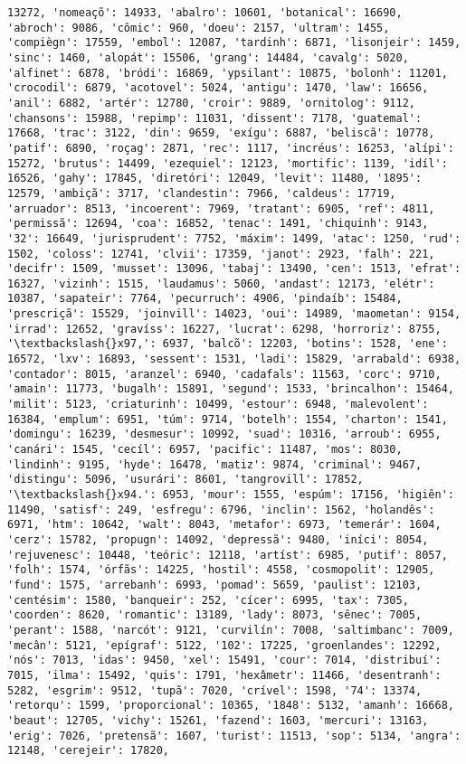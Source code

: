 \begin{Verbatim}[commandchars=\\\{\}]
13272, 'nomeaçõ': 14933, 'abalro': 10601, 'botanical': 16690, 'abroch': 9086, 'cômic': 960, 'doeu': 2157, 'ultram': 1455, 'compiègn': 17559, 'embol': 12087, 'tardinh': 6871, 'lisonjeir': 1459, 'sinc': 1460, 'alopát': 15506, 'grang': 14484, 'cavalg': 5020, 'alfinet': 6878, 'bródi': 16869, 'ypsilant': 10875, 'bolonh': 11201, 'crocodil': 6879, 'acotovel': 5024, 'antigu': 1470, 'law': 16656, 'anil': 6882, 'artér': 12780, 'croir': 9889, 'ornitolog': 9112, 'chansons': 15988, 'repimp': 11031, 'dissent': 7178, 'guatemal': 17668, 'trac': 3122, 'din': 9659, 'exígu': 6887, 'beliscã': 10778, 'patif': 6890, 'roçag': 2871, 'rec': 1117, 'incréus': 16253, 'alípi': 15272, 'brutus': 14499, 'ezequiel': 12123, 'mortific': 1139, 'idíl': 16526, 'gahy': 17845, 'diretóri': 12049, 'levit': 11480, '1895': 12579, 'ambiçã': 3717, 'clandestin': 7966, 'caldeus': 17719, 'arruador': 8513, 'incoerent': 7969, 'tratant': 6905, 'ref': 4811, 'permissã': 12694, 'coa': 16852, 'tenac': 1491, 'chiquinh': 9143, '32': 16649, 'jurisprudent': 7752, 'máxim': 1499, 'atac': 1250, 'rud': 1502, 'coloss': 12741, 'clvii': 17359, 'janot': 2923, 'falh': 221, 'decifr': 1509, 'musset': 13096, 'tabaj': 13490, 'cen': 1513, 'efrat': 16327, 'vizinh': 1515, 'laudamus': 5060, 'andast': 12173, 'elétr': 10387, 'sapateir': 7764, 'pecurruch': 4906, 'pindaíb': 15484, 'prescriçã': 15529, 'joinvill': 14023, 'oui': 14989, 'maometan': 9154, 'irrad': 12652, 'gravíss': 16227, 'lucrat': 6298, 'horroriz': 8755, '\textbackslash{}x97,': 6937, 'balcõ': 12203, 'botins': 1528, 'ene': 16572, 'lxv': 16893, 'sessent': 1531, 'ladi': 15829, 'arrabald': 6938, 'contador': 8015, 'aranzel': 6940, 'cadafals': 11563, 'corc': 9710, 'amain': 11773, 'bugalh': 15891, 'segund': 1533, 'brincalhon': 15464, 'milit': 5123, 'criaturinh': 10499, 'estour': 6948, 'malevolent': 16384, 'emplum': 6951, 'túm': 9714, 'botelh': 1554, 'charton': 1541, 'domingu': 16239, 'desmesur': 10992, 'suad': 10316, 'arroub': 6955, 'canári': 1545, 'cecíl': 6957, 'pacific': 11487, 'mos': 8030, 'lindinh': 9195, 'hyde': 16478, 'matiz': 9874, 'criminal': 9467, 'distingu': 5096, 'usurári': 8601, 'tangrovill': 17852, '\textbackslash{}x94.': 6953, 'mour': 1555, 'espúm': 17156, 'higiên': 11490, 'satisf': 249, 'esfregu': 6796, 'inclin': 1562, 'holandês': 6971, 'htm': 10642, 'walt': 8043, 'metafor': 6973, 'temerár': 1604, 'cerz': 15782, 'propugn': 14092, 'depressã': 9480, 'iníci': 8054, 'rejuvenesc': 10448, 'teóric': 12118, 'artíst': 6985, 'putif': 8057, 'folh': 1574, 'órfãs': 14225, 'hostil': 4558, 'cosmopolit': 12905, 'fund': 1575, 'arrebanh': 6993, 'pomad': 5659, 'paulist': 12103, 'centésim': 1580, 'banqueir': 252, 'cícer': 6995, 'tax': 7305, 'coorden': 8620, 'romantic': 13189, 'lady': 8073, 'sênec': 7005, 'perant': 1588, 'narcót': 9121, 'curvilín': 7008, 'saltimbanc': 7009, 'mecân': 5121, 'epígraf': 5122, '102': 17225, 'groenlandes': 12292, 'nós': 7013, 'idas': 9450, 'xel': 15491, 'cour': 7014, 'distribuí': 7015, 'ilma': 15492, 'quis': 1791, 'hexâmetr': 11466, 'desentranh': 5282, 'esgrim': 9512, 'tupã': 7020, 'crível': 1598, '74': 13374, 'retorqu': 1599, 'proporcional': 10365, '1848': 5132, 'amanh': 16668, 'beaut': 12705, 'vichy': 15261, 'fazend': 1603, 'mercuri': 13163, 'erig': 7026, 'pretensã': 1607, 'turist': 11513, 'sop': 5134, 'angra': 12148, 'cerejeir': 17820, 
\end{Verbatim}

